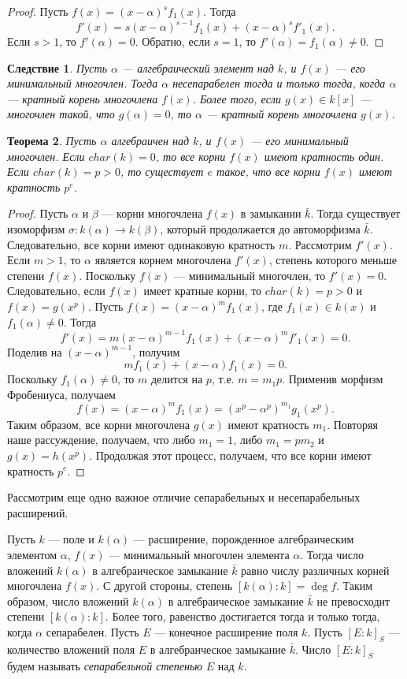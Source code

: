 \documentclass[12pt, titlepage, oneside]{amsbook}
\newtheorem{theorem}{Теорема}[chapter]
\newtheorem{corollary}[theorem]{Следствие}
\theoremstyle{definition}
\theoremstyle{remark}
\begin{document}
\begin{proof}
Пусть $f(x)=(x-\alpha)^sf_1(x)$. Тогда $$f'(x)=s(x-\alpha)^{s-1}f_1(x)+(x-\alpha)^sf'_1(x).$$ Если $s>1$, то $f'(\alpha)=0$. Обратно, если $s=1$, то $f'(\alpha)=f_1(\alpha)\neq 0$.
\end{proof}

 \begin{corollary}
\label{Sep3}
Пусть $\alpha$ --- алгебраический элемент над $k$, и $f(x)$ --- его минимальный многочлен. Тогда $\alpha$ несепарабелен тогда и только тогда, когда $\alpha$ --- кратный корень многочлена $f(x)$. Более того, если $g(x)\in k[x]$ --- многочлен такой, что $g(\alpha)=0$, то $\alpha$ --- кратный корень многочлена $g(x)$.
\end{corollary}

\begin{theorem}
\label{Sep4}
Пусть $\alpha$ алгебраичен над $k$, и $f(x)$ --- его минимальный многочлен. Если $char(k)=0$, то все корни $f(x)$ имеют кратность один. Если $char(k)=p>0$, то существует $e$ такое, что все корни $f(x)$ имеют кратность $p^e$.
\end{theorem}

\begin{proof}
Пусть $\alpha$ и $\beta$ --- корни многочлена $f(x)$ в замыкании $\bar{k}$. Тогда существует изоморфизм $\sigma\colon k(\alpha)\rightarrow k(\beta)$, который продолжается до автоморфизма $\bar{k}$. Следовательно, все корни имеют одинаковую кратность $m$. Рассмотрим $f'(x)$. Если $m>1$, то $\alpha$ является корнем многочлена $f'(x)$, степень которого меньше степени $f(x)$. Поскольку $f(x)$ --- минимальный многочлен, то $f'(x)=0$. Следовательно, если $f(x)$ имеет кратные корни, то $char(k)=p>0$  и $f(x)=g(x^p)$. Пусть $f(x)=(x-\alpha)^mf_1(x)$, где $f_1(x)\in k(x)$ и $f_1(\alpha)\neq 0$. Тогда $$f'(x)=m(x-\alpha)^{m-1}f_1(x)+(x-\alpha)^mf'_1(x)=0.$$ Поделив на $(x-\alpha)^{m-1}$, получим $$mf_1(x)+(x-\alpha)f_1(x)=0.$$ Поскольку $f_1(\alpha)\neq 0$, то $m$ делится на $p$, т.е. $m=m_1 p$. Применив морфизм Фробениуса, получаем $$f(x)=(x-\alpha)^mf_1(x)=(x^p-\alpha^p)^{m_1}g_1(x^p).$$ Таким образом, все корни многочлена $g(x)$ имеют кратность $m_1$. Повторяя наше рассуждение, получаем, что либо $m_1=1$, либо $m_1=pm_2$ и $g(x)=h(x^p)$. Продолжая этот процесс, получаем, что все корни имеют кратность $p^e$.
\end{proof}

Рассмотрим еще одно важное отличие сепарабельных и несепарабельных расширений.

Пусть $k$ --- поле и $k(\alpha)$ --- расширение, порожденное алгебраическим элементом $\alpha$, $f(x)$ --- минимальный многочлен элемента $\alpha$. Тогда число вложений $k(\alpha)$ в алгебраическое замыкание $\bar{k}$ равно числу различных корней многочлена $f(x)$. С другой стороны, степень $[k(\alpha):k]=\deg f$. Таким образом, число вложений $k(\alpha)$ в алгебраическое замыкание $\bar{k}$ не превосходит степени $[k(\alpha):k]$. Более того, равенство достигается тогда и только тогда, когда $\alpha$ сепарабелен. Пусть $E$ --- конечное расширение поля $k$. Пусть $[E:k]_S$ --- количество вложений поля $E$ в алгебраическое замыкание $\bar{k}$. Число $[E:k]_S$ будем называть \emph{сепарабельной степенью} $E$ над $k$.
\end{document}
